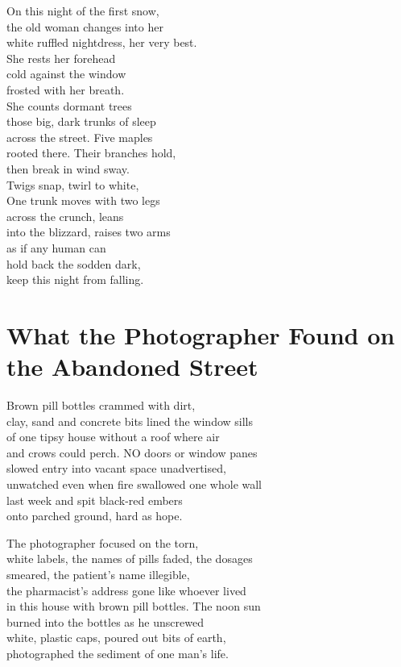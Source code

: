 \documentclass[twoside,10pt]{book}
\begin{document}
On this night of the first snow,\\
the old woman changes into her\\
white ruffled nightdress, her very best.\\
She rests her forehead\\
cold against the window\\
frosted with her breath.\\
She counts dormant trees\\
those big, dark trunks of sleep\\
across the street. Five maples\\
rooted there. Their branches hold,\\
then break in wind sway.\\
Twigs snap, twirl to white,\\
One trunk moves with two legs\\
across the crunch, leans\\
into the blizzard, raises two arms\\
as if any human can\\
hold back the sodden dark,\\
keep this night from falling.


\clearpage
\section{What the Photographer Found
on the Abandoned Street}

Brown pill bottles crammed with dirt,\\
clay, sand and concrete bits lined the window sills\\
of one tipsy house without a roof where air\\
and crows could perch. NO doors or window panes\\
slowed entry into vacant space unadvertised,\\
unwatched even when fire swallowed one whole wall\\
last week and spit black-red embers\\
onto parched ground, hard as hope.

The photographer focused on the torn,\\
white labels, the names of pills faded, the dosages\\
smeared, the patient's name illegible,\\
the pharmacist's address gone like whoever lived\\
in this house with brown pill bottles. The noon sun\\
burned into the bottles as he unscrewed\\
white, plastic caps, poured out bits of earth,\\
photographed the sediment of one man's life.
\end{document}
